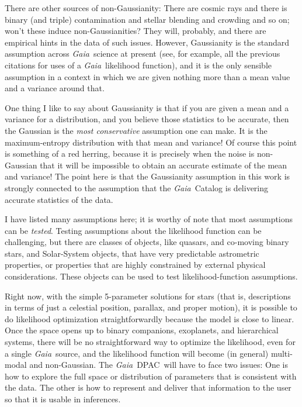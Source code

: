 \documentclass[12pt, modern]{aastex62h}
\newcommand{\acronym}[1]{{\small{#1}}}
\newcommand{\Gaia}{\textsl{Gaia}}
\newcommand{\DPAC}{{\acronym{DPAC}}}
\begin{document}
There are other sources of non-Gaussianity:
There are cosmic rays and there is binary (and triple)
contamination and stellar blending and crowding and so on; won't these
induce non-Gaussianities?
They will, probably, and there are empirical hints in the data
of such issues.
However, Gaussianity is the standard assumption across \Gaia\ science at
present (see, for example, all the previous citations for uses of a
\Gaia\ likelihood function), and it is the only sensible assumption in a
context in which we are given nothing more than a mean value and a variance
around that.

One thing I like to say about Gaussianity is that if you are given a mean
and a variance for a distribution, and you believe those statistics to be
accurate, then the Gaussian is the \emph{most conservative} assumption one
can make.
It is the maximum-entropy distribution with that mean and variance!
Of course this point is something of a red herring, because it is precisely
when the noise is non-Gaussian that it will be impossible to obtain an
accurate estimate of the mean and variance!
The point here is that the Gaussianity assumption in this work is strongly connected
to the assumption that the \Gaia\ Catalog is delivering accurate statistics of
the data.

I have listed many assumptions here; it is worthy of note that most
assumptions can be \emph{tested}.
Testing assumptions about the likelihood function can be challenging,
but there are classes of objects, like quasars, and co-moving binary stars,
and Solar-System objects, that have very predictable astrometric properties,
or properties that are highly constrained by external physical considerations.
These objects can be used to test likelihood-function assumptions.

Right now, with the simple 5-parameter solutions for stars (that is, descriptions
in terms of just a celestial position, parallax, and proper motion), it is possible
to do likelihood optimization straightforwardly because the model is close to linear.
Once the space opens up to binary companions, exoplanets, and hierarchical systems,
there will be no straightforward way to optimize the likelihood, even for
a single \Gaia\ source, and the likelihood function will become
(in general) multi-modal and non-Gaussian.
The \Gaia\ \DPAC\ will have to face two issues:
One is how to explore the full space or distribution of parameters that is
consistent with the data.
The other is how to represent and deliver that information to the user
so that it is usable in inferences.
\end{document}
